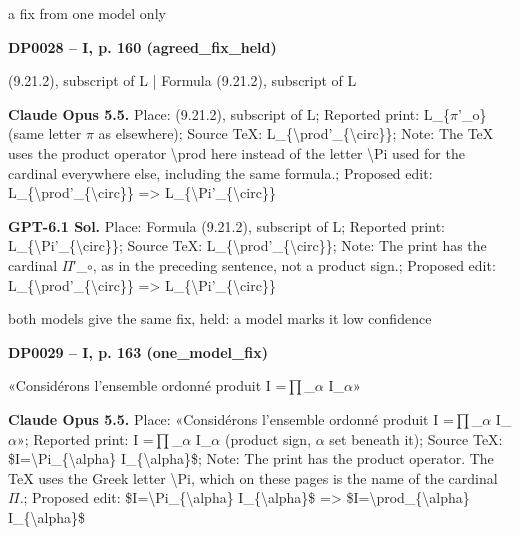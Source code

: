 a fix from one model only\par
\par\noindent\hypertarget{DP0028}{}\textbf{DP0028 -- I, p. 160 (agreed\_fix\_held)}\par
(9.21.2), subscript of L | Formula (9.21.2), subscript of L\par
\textbf{Claude Opus 5.5.} Place: (9.21.2), subscript of L; Reported print: L\_\{\ensuremath{\pi}'\_o\} (same letter \ensuremath{\pi} as elsewhere); Source TeX: L\_\{\textbackslash{}prod'\_\{\textbackslash{}circ\}\}; Note: The TeX uses the product operator \textbackslash{}prod here instead of the letter \textbackslash{}Pi used for the cardinal everywhere else, including the same formula.; Proposed edit: L\_\{\textbackslash{}prod'\_\{\textbackslash{}circ\}\} =\allowbreak > L\_\{\textbackslash{}Pi'\_\{\textbackslash{}circ\}\}\par
\textbf{GPT-6.1 Sol.} Place: Formula (9.21.2), subscript of L; Reported print: L\_\{\textbackslash{}Pi'\_\{\textbackslash{}circ\}\}; Source TeX: L\_\{\textbackslash{}prod'\_\{\textbackslash{}circ\}\}; Note: The print has the cardinal \ensuremath{\Pi}′\_\ensuremath{\circ}, as in the preceding sentence, not a product sign.; Proposed edit: L\_\{\textbackslash{}prod'\_\{\textbackslash{}circ\}\} =\allowbreak > L\_\{\textbackslash{}Pi'\_\{\textbackslash{}circ\}\}\par
both models give the same fix, held: a model marks it low confidence\par
\par\noindent\hypertarget{DP0029}{}\textbf{DP0029 -- I, p. 163 (one\_model\_fix)}\par
«Considérons l'ensemble ordonné produit I =\allowbreak  \ensuremath{\prod}\_\ensuremath{\alpha} I\_\ensuremath{\alpha}»\par
\textbf{Claude Opus 5.5.} Place: «Considérons l'ensemble ordonné produit I =\allowbreak  \ensuremath{\prod}\_\ensuremath{\alpha} I\_\ensuremath{\alpha}»; Reported print: I =\allowbreak  \ensuremath{\prod}\_\ensuremath{\alpha} I\_\ensuremath{\alpha} (product sign, \ensuremath{\alpha} set beneath it); Source TeX: \$I=\allowbreak \textbackslash{}Pi\_\{\textbackslash{}alpha\} I\_\{\textbackslash{}alpha\}\$; Note: The print has the product operator. The TeX uses the Greek letter \textbackslash{}Pi, which on these pages is the name of the cardinal \ensuremath{\Pi}.; Proposed edit: \$I=\allowbreak \textbackslash{}Pi\_\{\textbackslash{}alpha\} I\_\{\textbackslash{}alpha\}\$ =\allowbreak > \$I=\allowbreak \textbackslash{}prod\_\{\textbackslash{}alpha\} I\_\{\textbackslash{}alpha\}\$\par

